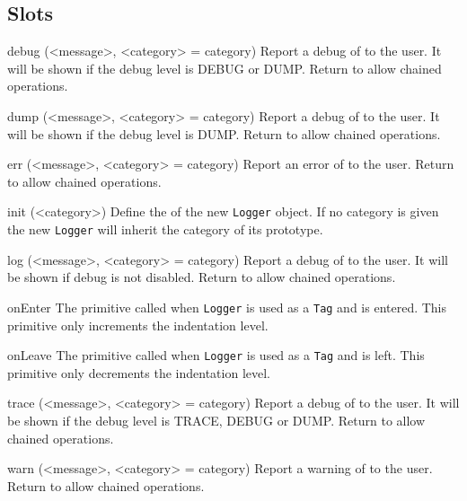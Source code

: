 \subsection{Slots}

\begin{urbiscriptapi}

\item[debug](<message>, <category> = category)%
  Report a debug  of  to the user. It will be
  shown if the debug level is DEBUG or DUMP. Return \this to allow chained
  operations.

\item[dump](<message>, <category> = category)%
  Report a debug  of  to the user. It will be
  shown if the debug level is DUMP. Return \this to allow chained
  operations.

\item[err](<message>, <category> = category)%
  Report an error  of  to the user. Return \this
  to allow chained operations.

\item[init](<category>)%
  Define the  of the new \lstinline|Logger| object. If no
  category is given the new \lstinline|Logger| will inherit the category of
  its prototype.

\item[log](<message>, <category> = category)%
  Report a debug  of  to the user. It will be
  shown if debug is not disabled. Return \this to allow chained operations.

\item[onEnter]%
  The primitive called when \lstinline|Logger| is used as a \lstinline|Tag|
  and is entered. This primitive only increments the indentation level.

\item[onLeave]%
  The primitive called when \lstinline|Logger| is used as a \lstinline|Tag|
  and is left. This primitive only decrements the indentation level.

\item[trace](<message>, <category> = category)%
  Report a debug  of  to the user. It will be
  shown if the debug level is TRACE, DEBUG or DUMP. Return \this to allow
  chained operations.

\item[warn](<message>, <category> = category)%
  Report a warning  of  to the user. Return \this
  to allow chained operations.
\end{urbiscriptapi}

